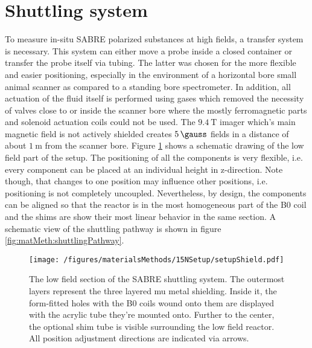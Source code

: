     \section{Shuttling system}
    \label{sec:shuttlingSystem}
    To measure in-situ SABRE polarized substances at high fields, a transfer system is necessary. This system can either move a probe inside a closed container \cite{kiryutin_fast_2016-1} or transfer the probe itself via tubing. The latter was chosen for the more flexible and easier positioning, especially in the environment of a horizontal bore small animal scanner as compared to a standing bore spectrometer. In addition, all actuation of the fluid itself is performed using gases which removed the necessity of valves close to or inside the scanner bore where the mostly ferromagnetic parts and solenoid actuation coils could not be used.
    The $\SI{9.4}{\tesla}$ imager which's main magnetic field is not actively shielded creates $\SI{5}{\gauss}$ fields in a distance of about $\SI{1}{\meter}$ from the scanner bore.
    Figure \ref{fig:matMeth:shields15N} shows a schematic drawing of the low field part of the setup. The positioning of all the components is very flexible, i.e. every component can be placed at an individual height in z-direction. Note though, that changes to one position may influence other positions, i.e. positioning is not completely uncoupled. Nevertheless, by design, the components can be aligned so that the reactor is in the most homogeneous part of the B0 coil and the shims are show their most linear behavior in the same section. A schematic view of the shuttling pathway is shown in figure \ref{fig:matMeth:shuttlingPathway}.
        \begin{figure}
            \texttt{[image: /figures/materialsMethods/15NSetup/setupShield.pdf]}
            \caption[Shuttling system shields]{The low field section of the SABRE shuttling system. The outermost layers represent the three layered mu metal shielding. Inside it, the form-fitted holes with the B0 coils wound onto them are displayed with the acrylic tube they're mounted onto. Further to the center, the optional shim tube is visible surrounding the low field reactor. All position adjustment directions are indicated via arrows.}
            \label{fig:matMeth:shields15N}
        \end{figure}
